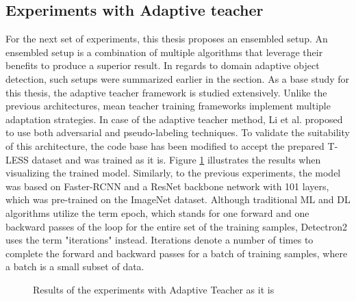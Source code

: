 \documentclass[english, 12pt, a4paper, elec, utf8, a-1b, online]{aaltothesis}
\begin{document}
\subsection{Experiments with Adaptive teacher}
\label{ensemExp} 
For the next set of experiments, this thesis proposes an ensembled setup. An ensembled setup is a combination of multiple algorithms that leverage their benefits to produce a superior result. In regards to domain adaptive object detection, such setups were summarized earlier in the  section. As a base study for this thesis, the adaptive teacher \cite{Li2021}  framework is studied extensively. Unlike the  previous architectures, mean teacher training frameworks implement multiple adaptation strategies. In case of the adaptive teacher method, Li et al. proposed to use both adversarial and pseudo-labeling techniques. To validate the suitability of this architecture, the code base has been modified to accept the prepared T-LESS dataset and was trained as it is. Figure \ref{adapt_experiment1} illustrates the results when visualizing the trained model. Similarly, to the previous experiments, the model was based on Faster-RCNN \cite{ima} and a ResNet \cite{He2015} backbone network with 101 layers, which was pre-trained on the ImageNet  \cite{Russakovsky2014} dataset. Although traditional ML and DL algorithms utilize the term epoch, which stands for one forward and one backward passes of the loop for the entire set of the training samples, Detectron2 \cite{wu2019Detectron2} uses the term "iterations" instead. Iterations denote a number of times to complete the forward and backward passes for a batch of training samples, where a batch is a small subset of data. 

\begin{figure}[htb]
    \centering
    \qquad
    \caption{Results of the experiments with Adaptive Teacher as it is}\label{adapt_experiment1}%
\end{figure}
\FloatBarrier
\end{document}
